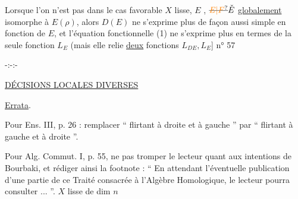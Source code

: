 Lorsque l'on n'est pas dans le cas favorable $X$ lisse, $E$ , $\deleted{\unsure{E|F}}\check E$ \uline{globalement} isomorphe à $E(\rho)$, alors $D(E)$ ne s'exprime plus de façon aussi simple en fonction de $E$, et l'équation fonctionnelle (1) ne s'exprime plus  en termes de la seule fonction $L_E$ (mais elle relie \uline{deux} fonctions $L_{DE},L_E$]
\hfill n° 57


\begin{center}-:-:-\end{center}

\begin{center}\uline{DÉCISIONS LOCALES DIVERSES}\end{center}

\uline{Errata}.

Pour Ens. III, p. 26 : remplacer `` flirtant à droite et à gauche '' par `` flirtant à gauche et à droite ''.

Pour Alg. Commut. I, p. 55, ne pas tromper le lecteur quant aux intentions de Bourbaki, et rédiger ainsi la footnote : `` En attendant l'éventuelle publication d'une partie de ce Traité consacrée à l'Algèbre Homologique, le lecteur pourra consulter ... ''.
$X$ lisse  de dim $n$


